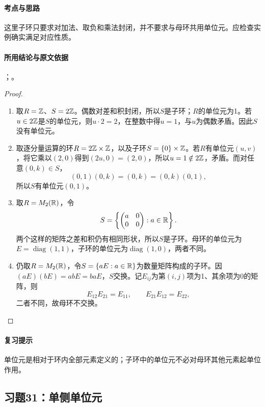 \paragraph{考点与思路}
这里子环只要求对加法、取负和乘法封闭，并不要求与母环共用单位元。应检查实例确实满足对应性质。

\paragraph{所用结论与原文依据}
；。


\begin{proof}
\begin{enumerate}\item 取$R=\mathbb Z$、$S=2\mathbb Z$。偶数对差和积封闭，所以$S$是子环；$R$的单位元为1。若$u\in2\mathbb Z$是$S$的单位元，则$u\cdot2=2$，在整数中得$u=1$，与$u$为偶数矛盾。因此$S$没有单位元。

\item 取逐分量运算的环$R=2\mathbb Z\times\mathbb Z$，以及子环$S=\{0\}\times\mathbb Z$。若$R$有单位元$(u,v)$，将它乘以$(2,0)$得到$(2u,0)=(2,0)$，所以$u=1\notin2\mathbb Z$，矛盾。而对任意$(0,k)\in S$，
\[
(0,1)(0,k)=(0,k)=(0,k)(0,1),
\]
所以$S$有单位元$(0,1)$。

\item 取$R=M_2(\mathbb R)$，令
\[
S=\left\{\begin{pmatrix}a&0\\0&0\end{pmatrix}:a\in\mathbb R\right\}.
\]
两个这样的矩阵之差和积仍有相同形状，所以$S$是子环。母环的单位元为$E=\operatorname{diag}(1,1)$，子环的单位元为$\operatorname{diag}(1,0)$，两者不同。

\item 仍取$R=M_2(\mathbb R)$，令$S=\{aE:a\in\mathbb R\}$为数量矩阵构成的子环。因$(aE)(bE)=abE=baE$，$S$交换。记$E_{ij}$为第$(i,j)$项为1、其余项为0的矩阵，则
\[
E_{12}E_{21}=E_{11},\qquad E_{21}E_{12}=E_{22},
\]
二者不同，故母环不交换。
\end{enumerate}
\end{proof}

\paragraph{复习提示}
单位元是相对于环内全部元素定义的；子环中的单位元不必对母环其他元素起单位作用。


\subsection{习题31：\texorpdfstring{单侧单位元}{单侧单位元}}
\label{ex:1:31}

